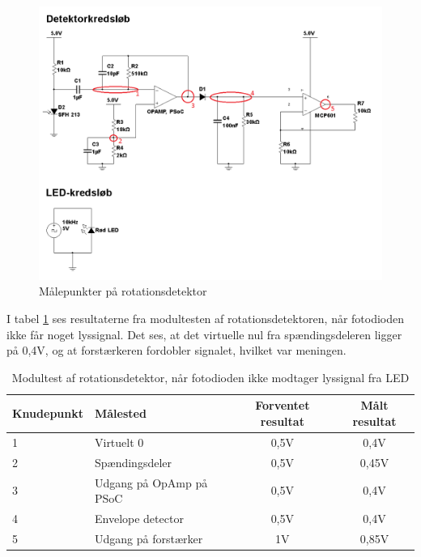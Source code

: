 \begin{figure}[H]
	\centering
	\includegraphics[width=\textwidth]{Test/images/rotationsdetektor_maalepunkter}
	\caption{Målepunkter på rotationsdetektor}
	\label{fig:målepunkter}
\end{figure}

I tabel \ref{dioderIkkeSe} ses resultaterne fra modultesten af rotationsdetektoren, når fotodioden ikke får noget lyssignal. Det ses, at det virtuelle nul fra spændingsdeleren ligger på 0,4V, og at forstærkeren fordobler signalet, hvilket var meningen. 

\begin{table}[H]
	\centering
	\begin{tabular}{|l|l|c|c|}
		\hline
		\textbf{Knudepunkt}		& \textbf{Målested}       & \textbf{Forventet resultat} & \textbf{Målt resultat} \\ \hline
		1						& Virtuelt 0              & 0,5V                        & 0,4V                   \\ \hline
		2						& Spændingsdeler          & 0,5V                        & 0,45V                  \\ \hline
		3						& Udgang på OpAmp på PSoC & 0,5V                        & 0,4V                   \\ \hline
		4 						& Envelope detector       & 0,5V                        & 0,4V                   \\ \hline
		5 						& Udgang på forstærker    & 1V                          & 0,85V                  \\ \hline
	\end{tabular}
	\caption{Modultest af rotationsdetektor, når fotodioden ikke modtager lyssignal fra LED}
	\label{dioderIkkeSe}
\end{table}

